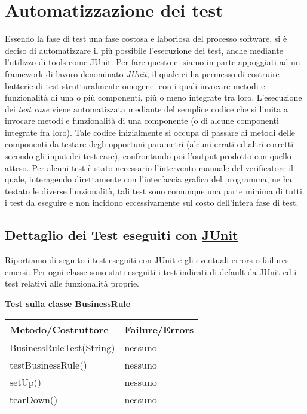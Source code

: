 \chapter{Automatizzazione dei test}
Essendo la fase di test una fase costosa e laboriosa del processo software, si \`e deciso di automatizzare il pi\`u possibile l’esecuzione dei test, anche mediante l'utilizzo  di tools come \underline{JUnit}.
Per fare questo ci siamo in parte appoggiati ad un framework di lavoro denominato \textit{JUnit}, il quale ci ha permesso di costruire batterie di test strutturalmente omogenei  con i quali invocare metodi e funzionalit\`a di una o pi\`u componenti, pi\`u o meno integrate tra loro. 
L’esecuzione dei \textit{test case} viene automatizzata mediante del semplice codice che si limita a invocare metodi e funzionalit\`a di una componente (o di alcune componenti integrate fra loro). Tale codice inizialmente si occupa di passare ai metodi delle componenti da testare degli opportuni parametri (alcuni errati ed altri corretti secondo gli input dei test case), confrontando poi l’output prodotto con quello atteso. 
Per alcuni test \`e stato necessario l'intervento manuale del verificatore il quale, interagendo direttamente con l'interfaccia grafica del programma, ne ha testato le diverse funzionalit\`a, tali test sono comunque una parte minima di tutti i test da eseguire e non incidono eccessivamente sul costo dell’intera fase di test.

\section{Dettaglio dei Test eseguiti con \underline{JUnit}}
Riportiamo di seguito i test eseguiti con \underline{JUnit} e gli eventuali errors o failures emersi.
Per ogni classe sono stati eseguiti i test indicati di default da JUnit ed i test relativi alle funzionalit\`a proprie.
\begin{center}
\textbf{Test sulla classe BusinessRule}\\
\begin{tabular}{|p{}|p{3 cm}|} \hline
\textbf{Metodo/Costruttore} & \textbf{Failure/Errors} \\ \hline
BusinessRuleTest(String) & nessuno \\ \hline
testBusinessRule() & nessuno \\ \hline
setUp() & nessuno \\ \hline
tearDown() & nessuno \\ \hline
\end{tabular}
\end{center}

